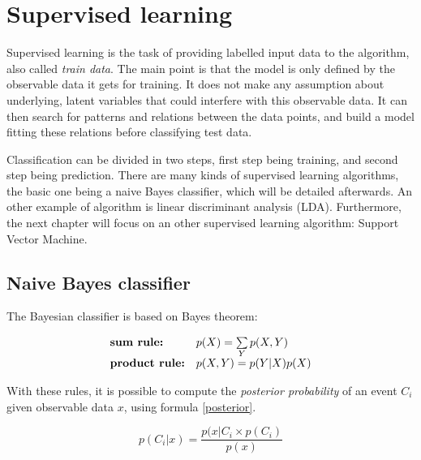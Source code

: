 \section{Supervised learning}

\vspace{\baselineskip}
\noindent Supervised learning is the task of providing labelled input data to the algorithm, also called \textit{train data}. The main point is that the model is only defined by the observable data it gets for training. It does not make any assumption about underlying, latent variables that could interfere with this observable data. It can then search for patterns and relations between the data points, and build a model fitting these relations before classifying test data.
\newline

\noindent Classification can be divided in two steps, first step being training, and second step being prediction. There are many kinds of supervised learning algorithms, the basic one being a naive Bayes classifier, which will be detailed afterwards. An other example of algorithm is linear discriminant analysis (LDA). Furthermore, the next chapter will focus on an other supervised learning algorithm: Support Vector Machine.
\newline

\subsection{Naive Bayes classifier}

\vspace{\baselineskip}
\noindent The Bayesian classifier is based on Bayes theorem:
\newline

\begin{equation}
    \begin{array}{ll}
        \text{\textbf{sum rule: }} & p(X) = \sum\limits_{Y} p(X,Y) \\
        \text{\textbf{product rule:}} & p(X,Y) = p(Y|X)p(X)
    \end{array}
    \label{bayes}
\end{equation}

\vspace{\baselineskip}
\noindent With these rules, it is possible to compute the \textit{posterior probability} of an event $C_i$ given observable data $x$, using formula \ref{posterior}.

\begin{equation}
	p(C_i|x) = \frac{p(x|C_i \times p(C_i)}{p(x)}
	\label{posterior}
\end{equation}

